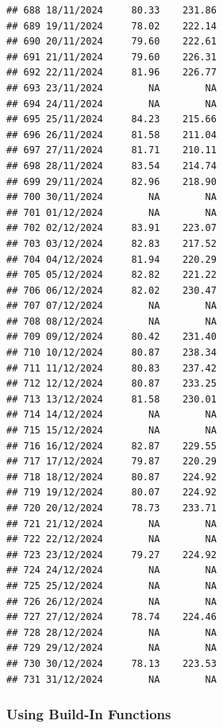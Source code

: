 \documentclass[
]{article}
\newenvironment{Shaded}{\begin{snugshade}}{\end{snugshade}}
\newcommand{\NormalTok}[1]{#1}
\newcommand{\OtherTok}[1]{\textcolor[rgb]{0.56,0.35,0.01}{#1}}
\newcommand{\SpecialCharTok}[1]{\textcolor[rgb]{0.81,0.36,0.00}{\textbf{#1}}}
\begin{document}
\begin{verbatim}
## 688 18/11/2024     80.33    231.86
## 689 19/11/2024     78.02    222.14
## 690 20/11/2024     79.60    222.61
## 691 21/11/2024     79.60    226.31
## 692 22/11/2024     81.96    226.77
## 693 23/11/2024        NA        NA
## 694 24/11/2024        NA        NA
## 695 25/11/2024     84.23    215.66
## 696 26/11/2024     81.58    211.04
## 697 27/11/2024     81.71    210.11
## 698 28/11/2024     83.54    214.74
## 699 29/11/2024     82.96    218.90
## 700 30/11/2024        NA        NA
## 701 01/12/2024        NA        NA
## 702 02/12/2024     83.91    223.07
## 703 03/12/2024     82.83    217.52
## 704 04/12/2024     81.94    220.29
## 705 05/12/2024     82.82    221.22
## 706 06/12/2024     82.02    230.47
## 707 07/12/2024        NA        NA
## 708 08/12/2024        NA        NA
## 709 09/12/2024     80.42    231.40
## 710 10/12/2024     80.87    238.34
## 711 11/12/2024     80.83    237.42
## 712 12/12/2024     80.87    233.25
## 713 13/12/2024     81.58    230.01
## 714 14/12/2024        NA        NA
## 715 15/12/2024        NA        NA
## 716 16/12/2024     82.87    229.55
## 717 17/12/2024     79.87    220.29
## 718 18/12/2024     80.87    224.92
## 719 19/12/2024     80.07    224.92
## 720 20/12/2024     78.73    233.71
## 721 21/12/2024        NA        NA
## 722 22/12/2024        NA        NA
## 723 23/12/2024     79.27    224.92
## 724 24/12/2024        NA        NA
## 725 25/12/2024        NA        NA
## 726 26/12/2024        NA        NA
## 727 27/12/2024     78.74    224.46
## 728 28/12/2024        NA        NA
## 729 29/12/2024        NA        NA
## 730 30/12/2024     78.13    223.53
## 731 31/12/2024        NA        NA
\end{verbatim}

\begin{Shaded}
\end{Shaded}

\subsubsection{Using Build-In Functions}\label{using-build-in-functions}
\end{document}
